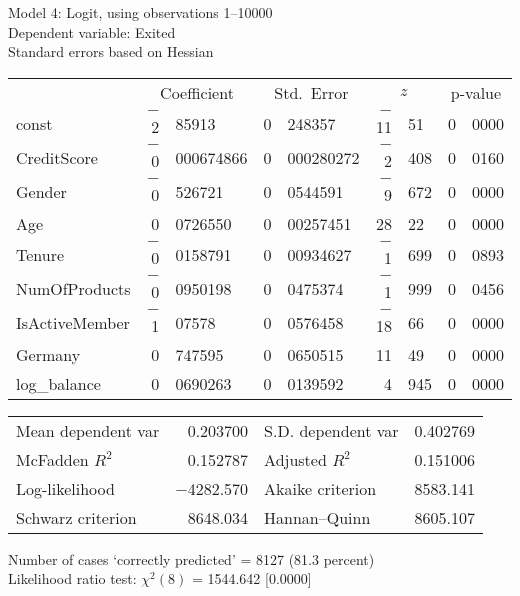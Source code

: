 \documentclass[11pt]{article}
\begin{document}
\thispagestyle{empty}

\begin{center}

Model 4: Logit, using observations 1--10000\\
Dependent variable: Exited\\
Standard errors based on Hessian

\vspace{1em}

\begin{tabular}{lr@{.}lr@{.}lr@{.}lr@{.}l}
  &
 \multicolumn{2}{c}{Coefficient} &
  \multicolumn{2}{c}{Std.\ Error} &
   \multicolumn{2}{c}{$z$} &
    \multicolumn{2}{c}{p-value} \\[1ex]
const &
  $-$2&85913 &
    0&248357 &
      $-$11&51 &
        0&0000 \\
CreditScore &
  $-$0&000674866 &
    0&000280272 &
      $-$2&408 &
        0&0160 \\
Gender &
  $-$0&526721 &
    0&0544591 &
      $-$9&672 &
        0&0000 \\
Age &
  0&0726550 &
    0&00257451 &
      28&22 &
        0&0000 \\
Tenure &
  $-$0&0158791 &
    0&00934627 &
      $-$1&699 &
        0&0893 \\
NumOfProducts &
  $-$0&0950198 &
    0&0475374 &
      $-$1&999 &
        0&0456 \\
IsActiveMember &
  $-$1&07578 &
    0&0576458 &
      $-$18&66 &
        0&0000 \\
Germany &
  0&747595 &
    0&0650515 &
      11&49 &
        0&0000 \\
log\_balance &
  0&0690263 &
    0&0139592 &
      4&945 &
        0&0000 \\
\end{tabular}

\vspace{1ex}
\begin{tabular}{lrlr}
Mean dependent var &  0.203700 & S.D. dependent var &  0.402769 \\
McFadden $R^2$ &  0.152787 & Adjusted $R^2$ &  0.151006 \\
Log-likelihood & $-$4282.570 & Akaike criterion &  8583.141 \\
Schwarz criterion &  8648.034 & Hannan--Quinn &  8605.107 \\
\end{tabular}


\vspace{1ex}
\vspace{1em}
\begin{raggedright}
Number of cases `correctly predicted' = 8127 (81.3 percent)\\
Likelihood ratio test: $\chi^2(8)$ = 1544.642 [0.0000]\\
\end{raggedright}

\end{center}
\end{document}
